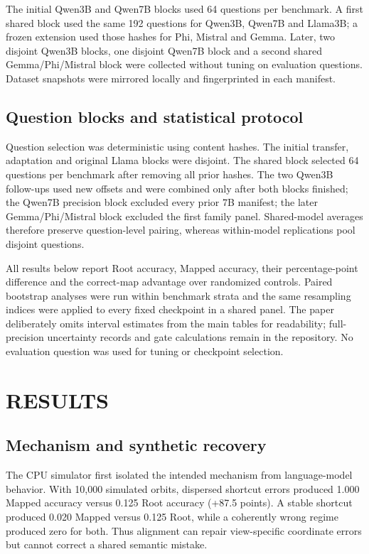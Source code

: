 \documentclass{article}
\begin{document}
The initial Qwen3B and Qwen7B blocks used 64 questions per benchmark. A first shared block used the same 192 questions for Qwen3B, Qwen7B and Llama3B; a frozen extension used those hashes for Phi, Mistral and Gemma. Later, two disjoint Qwen3B blocks, one disjoint Qwen7B block and a second shared Gemma/Phi/Mistral block were collected without tuning on evaluation questions. Dataset snapshots were mirrored locally and fingerprinted in each manifest.

\subsection{Question blocks and statistical protocol}
Question selection was deterministic using content hashes. The initial transfer, adaptation and original Llama blocks were disjoint. The shared block selected 64 questions per benchmark after removing all prior hashes. The two Qwen3B follow-ups used new offsets and were combined only after both blocks finished; the Qwen7B precision block excluded every prior 7B manifest; the later Gemma/Phi/Mistral block excluded the first family panel. Shared-model averages therefore preserve question-level pairing, whereas within-model replications pool disjoint questions.

All results below report Root accuracy, Mapped accuracy, their percentage-point difference and the correct-map advantage over randomized controls. Paired bootstrap analyses were run within benchmark strata and the same resampling indices were applied to every fixed checkpoint in a shared panel. The paper deliberately omits interval estimates from the main tables for readability; full-precision uncertainty records and gate calculations remain in the repository. No evaluation question was used for tuning or checkpoint selection.

\section{RESULTS}
\subsection{Mechanism and synthetic recovery}
The CPU simulator first isolated the intended mechanism from language-model behavior. With 10,000 simulated orbits, dispersed shortcut errors produced 1.000 Mapped accuracy versus 0.125 Root accuracy (+87.5 points). A stable shortcut produced 0.020 Mapped versus 0.125 Root, while a coherently wrong regime produced zero for both. Thus alignment can repair view-specific coordinate errors but cannot correct a shared semantic mistake.
\end{document}
